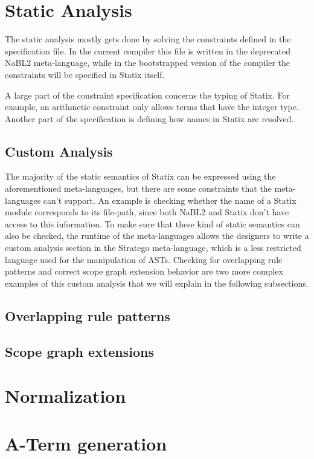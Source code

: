 \section{Static Analysis}
The static analysis mostly gets done by solving the constraints defined in the specification file. In the current compiler this file is written in the deprecated NaBL2 meta-language, while in the bootstrapped version of the compiler the constraints will be specified in Statix itself.

A large part of the constraint specification concerns the typing of Statix. For example, an arithmetic constraint only allows terms that have the integer type. Another part of the specification is defining how names in Statix are resolved.

\subsection{Custom Analysis}
The majority of the static semantics of Statix can be expressed using the aforementioned meta-languages, but there are some constraints that the meta-languages can't support. An example is checking whether the name of a Statix module corresponds to its file-path, since both NaBL2 and Statix don't have access to this information. To make sure that these kind of static semantics can also be checked, the runtime of the meta-languages allows the designers to write a custom analysis section in the Stratego meta-language, which is a less restricted language used for the manipulation of ASTs.
Checking for overlapping rule patterns and correct scope graph extension behavior are two more complex examples of this custom analysis that we will explain in the following subsections.

\subsection{Overlapping rule patterns}

\subsection{Scope graph extensions}


\section{Normalization}

\section{A-Term generation}